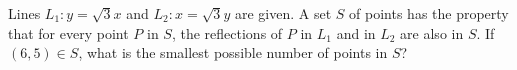 Lines $L_1\colon y=\sqrt3x$ and $L_2\colon x=\sqrt3y$ are given. A set $S$ of points has the property that for every point $P$ in $S$, the reflections of $P$ in $L_1$ and in $L_2$ are also in $S$. If $(6,5)\in S$, what is the smallest possible number of points in $S$?
